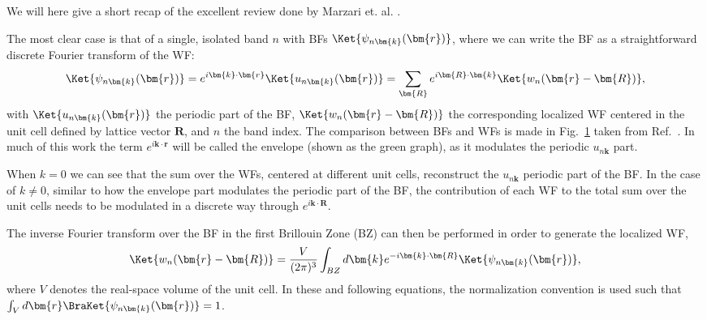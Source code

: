 We will here give a short recap of the excellent review done by Marzari et. al. \cite{Marzari2012}.

The most clear case is that of a single, isolated band $n$ with BFs $\Ket{\psi_{n\bm{k}}(\bm{r})}$, where we can write the BF as a straightforward discrete Fourier transform of the WF: 
\begin{equation}
	\label{eq:Theory_1bandwan}
	\Ket{\psi_{n\bm{k}}(\bm{r})} = e^{i\bm{k}\cdot\bm{r}} \Ket{u_{n\bm{k}}(\bm{r})} = \sum_{\bm{R}} e^{i \bm{R} \cdot \bm{k}} \Ket{w_n(\bm{r}-\bm{R})},
\end{equation}
with $\Ket{u_{n\bm{k}}(\bm{r})}$ the periodic part of the BF, $\Ket{w_n(\bm{r}-\bm{R})}$ the corresponding localized WF centered in the unit cell defined by lattice vector $\bm{R}$, and $n$ the band index.
The comparison between BFs and WFs is made in Fig.~\ref{fig:Theory_blochvswan} taken from Ref.~\cite{Marzari2012}.
In much of this work the term $e^{i\bm{k}\cdot\bm{r}}$ will be called the envelope (shown as the green graph), as it modulates the periodic $u_{n\bm{k}}$ part.
\begin{figure}
	\caption{\label{fig:Theory_blochvswan}}
\end{figure}
When $k=0$ we can see that the sum over the WFs, centered at different unit cells, reconstruct the $u_{n\bm{k}}$ periodic part of the BF.
In the case of $k \neq 0$, similar to how the envelope part modulates the periodic part of the BF, the contribution of each WF to the total sum over the unit cells needs to be modulated in a discrete way through $e^{i \bm{k} \cdot \bm{R}}$.

The inverse Fourier transform over the BF in the first Brillouin Zone (BZ) can then be performed in order to generate the localized WF,
\begin{equation}
	\Ket{w_{n}(\bm{r} - \bm{R})} = \frac{V}{(2\pi)^3} \int_{BZ} d \bm{k} e^{-i \bm{k} \cdot \bm{R}} \Ket{\psi_{n\bm{k}}(\bm{r})},
\end{equation}
where $V$ denotes the real-space volume of the unit cell.
In these and following equations, the normalization convention is used such that $\int_V d\bm{r}\BraKet{\psi_{n\bm{k}}(\bm{r})} = 1$.

